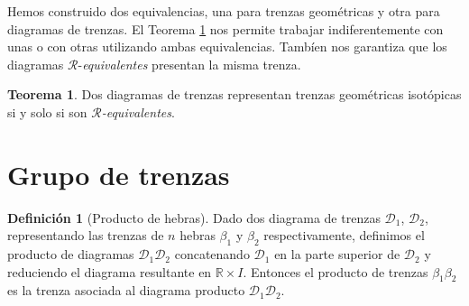 \documentclass[12pt]{article}
\theoremstyle{definition}
\newtheorem{defi}{Definición}[section]
\newtheorem{teor}{Teorema}[section]
\begin{document}
Hemos construido dos equivalencias, una para trenzas geométricas y otra para diagramas de trenzas. El Teorema \ref{teor:equiv} nos permite trabajar indiferentemente con unas o con otras utilizando ambas equivalencias. Tambíen nos garantiza que los diagramas $\mathcal{R}$-\textit{equivalentes} presentan la misma trenza.


\begin{teor}
Dos diagramas de trenzas representan trenzas geométricas isotópicas si y solo si son $\mathcal{R}$\textit{-equivalentes}.
\label{teor:equiv}
\end{teor}
\section{Grupo de trenzas}
\begin{defi}[Producto de hebras]
Dado dos diagrama de trenzas $\mathcal{D}_1$, $\mathcal{D}_2$, representando las trenzas de $n$ hebras $\beta_1$ y $\beta_2$ respectivamente, definimos el producto de diagramas $\mathcal{D}_1\mathcal{D}_2$ concatenando $\mathcal{D}_1$ en la parte superior de $\mathcal{D}_2$ y reduciendo el diagrama resultante en $\mathbb{R}\times I$. Entonces el producto de trenzas $\beta_1\beta_2$ es la trenza  asociada al diagrama producto $\mathcal{D}_1\mathcal{D}_2$.

\end{defi} 
\end{document}
